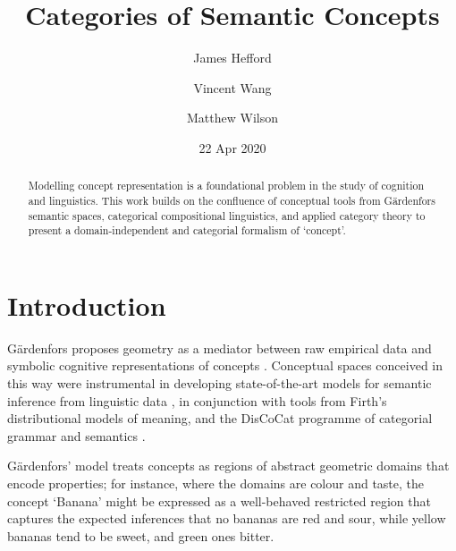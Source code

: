 \documentclass[11pt]{article}
\title{Categories of Semantic Concepts}
\author[1]{James Hefford}
\author[1]{Vincent Wang}
\author[1,2]{Matthew Wilson}
\affil[1]{University of Oxford, Department of Computer Science, Quantum Group}
\affil[2]{HKU-Oxford Joint Laboratory for Quantum Information and Computation}
\date{22 Apr 2020}
\theoremstyle{definition}
\theoremstyle{plain}
\begin{document}
\maketitle

\begin{abstract}
    Modelling concept representation is a foundational problem in the study of cognition and linguistics. This work builds on the confluence of conceptual tools from G\"{a}rdenfors semantic spaces, categorical compositional linguistics, and applied category theory to present a domain-independent and categorial formalism of `concept'.
\end{abstract}

\section{Introduction}

G\"{a}rdenfors proposes geometry as a mediator between raw empirical data and symbolic cognitive representations of concepts \cite{gardenfors_conceptual_2004}. Conceptual spaces conceived in this way were instrumental in developing state-of-the-art models for semantic inference from linguistic data \cite{bolt_interacting_2017}, in conjunction with tools from Firth's distributional models of meaning, and the DisCoCat programme of categorial grammar and semantics \cite{coecke_mathematical_2010}.

G\"{a}rdenfors' model treats concepts as regions of abstract geometric domains that encode properties; for instance, where the domains are colour and taste, the concept `Banana' might be expressed as a well-behaved restricted region that captures the expected inferences that no bananas are red and sour, while yellow bananas tend to be sweet, and green ones bitter.
\end{document}
